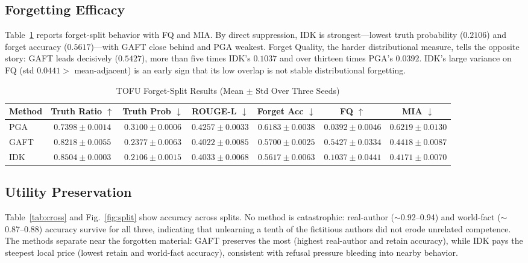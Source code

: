\documentclass[journal]{IEEEtran}
\begin{document}
\subsection{Forgetting Efficacy}
Table~\ref{tab:main} reports forget-split behavior with FQ and MIA. By direct suppression, IDK is strongest---lowest truth probability ($0.2106$) and forget accuracy ($0.5617$)---with GAFT close behind and PGA weakest. Forget Quality, the harder distributional measure, tells the opposite story: GAFT leads decisively ($0.5427$), more than five times IDK's $0.1037$ and over thirteen times PGA's $0.0392$. IDK's large variance on FQ (std $0.0441 >$ mean-adjacent) is an early sign that its low overlap is not stable distributional forgetting.

\begin{table}[!t]
\renewcommand{\arraystretch}{1.3}
\caption{TOFU Forget-Split Results (Mean $\pm$ Std Over Three Seeds)}
\label{tab:main}
\centering
\begin{tabular}{lcccccc}
\hline
\textbf{Method} & \textbf{Truth Ratio} $\uparrow$ & \textbf{Truth Prob} $\downarrow$ & \textbf{ROUGE-L} $\downarrow$ & \textbf{Forget Acc} $\downarrow$ & \textbf{FQ} $\uparrow$ & \textbf{MIA} $\downarrow$ \\
\hline
PGA  & $0.7398 \pm 0.0014$ & $0.3100 \pm 0.0006$ & $0.4257 \pm 0.0033$ & $0.6183 \pm 0.0038$ & $0.0392 \pm 0.0046$ & $0.6219 \pm 0.0130$ \\
GAFT & $0.8218 \pm 0.0055$ & $0.2377 \pm 0.0063$ & $0.4022 \pm 0.0085$ & $0.5700 \pm 0.0025$ & $\mathbf{0.5427 \pm 0.0334}$ & $0.4418 \pm 0.0087$ \\
IDK  & $\mathbf{0.8504 \pm 0.0003}$ & $\mathbf{0.2106 \pm 0.0015}$ & $0.4033 \pm 0.0068$ & $\mathbf{0.5617 \pm 0.0063}$ & $0.1037 \pm 0.0441$ & $\mathbf{0.4171 \pm 0.0070}$ \\
\hline
\end{tabular}
\end{table}

\subsection{Utility Preservation}
Table~\ref{tab:cross} and Fig.~\ref{fig:split} show accuracy across splits. No method is catastrophic: real-author ($\sim$0.92--0.94) and world-fact ($\sim$0.87--0.88) accuracy survive for all three, indicating that unlearning a tenth of the fictitious authors did not erode unrelated competence. The methods separate near the forgotten material: GAFT preserves the most (highest real-author and retain accuracy), while IDK pays the steepest local price (lowest retain and world-fact accuracy), consistent with refusal pressure bleeding into nearby behavior.
\end{document}
